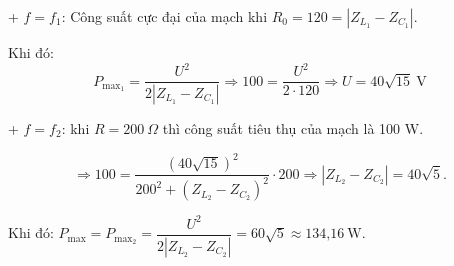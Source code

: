 \begin{enumerate}[label=\bfseries Câu \arabic*:]
{		+	$f=f_1$: Công suất cực đại của mạch khi $R_0 =120 = |Z_{L_1} - Z_{C_1}|.$
		
		Khi đó: $$P_{\text{max}_1} = \dfrac{U^2}{2|Z_{L_1} - Z_{C_1}|} \Rightarrow 100 =\dfrac{U^2}{2 \cdot 120} \Rightarrow U = 40\sqrt {15} \ \text{V}$$
		
		+ $f=f_2$: khi $R=200\ \Omega$ thì công suất tiêu thụ của mạch là 100 W.
		
		$$\Rightarrow 100 = \dfrac{(40\sqrt{15})^2}{200^2 + (Z_{L_2}-Z_{C_2})^2} \cdot 200 \Rightarrow |Z_{L_2}-Z_{C_2}| =40\sqrt 5.$$
		
		Khi đó: $P_\text{max} = P_{\text{max}_2} = \dfrac{U^2}{2|Z_{L_2}-Z_{C_2}|} =60\sqrt 5 \approx \text{134,16}\ \text{W}$.
		
		
	}
	

\end{enumerate}
